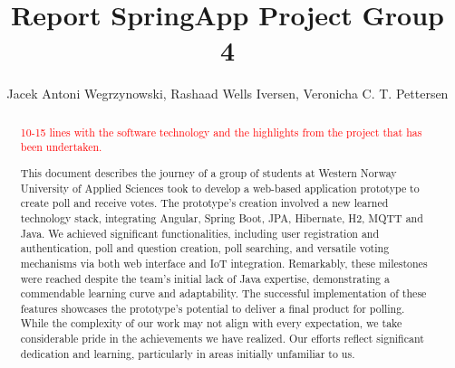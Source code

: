\documentclass[11pt]{article}
\begin{document}
\title{Report SpringApp Project Group 4}

\author{Jacek Antoni Wegrzynowski, Rashaad Wells Iversen, Veronicha C. T. Pettersen }

\maketitle

\begin{abstract}

\textcolor{red}{ 10-15 lines with the software technology and the highlights from the project that has been undertaken. }

This document describes the journey of a group of students at Western Norway University of Applied Sciences took to develop a web-based application prototype to create poll and receive votes.  The prototype's creation involved a new learned technology stack, integrating Angular, Spring Boot, JPA, Hibernate, H2, MQTT and Java.  We achieved significant functionalities, including user registration and authentication, poll and question creation, poll searching, and versatile voting mechanisms via both web interface and IoT integration.  Remarkably, these milestones were reached despite the team's initial lack of Java expertise, demonstrating a commendable learning curve and adaptability.  The successful implementation of these features showcases the prototype's potential to deliver a final product for polling.  While the complexity of our work may not align with every expectation, we take considerable pride in the achievements we have realized.  Our efforts reflect significant dedication and learning, particularly in areas initially unfamiliar to us.

\end{abstract}

%














{}
\end{document}
